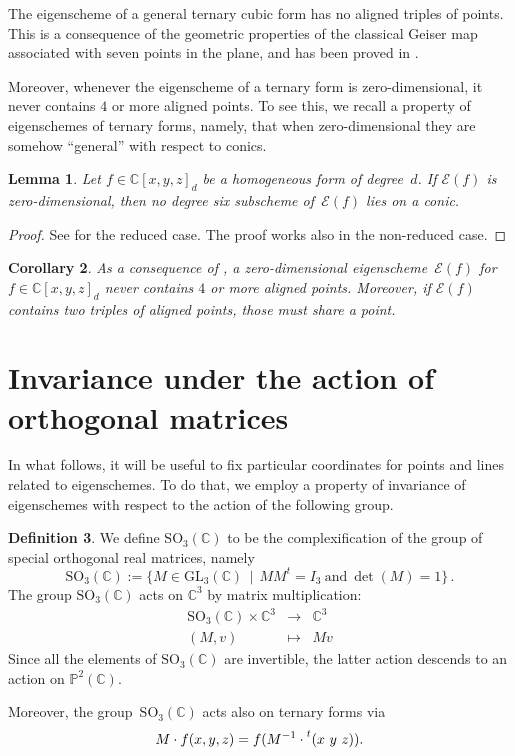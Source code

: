 \documentclass{amsart}
\theoremstyle{plain}
\newtheorem{lemma}{Lemma}[section]
\newtheorem{corollary}[lemma]{Corollary}
\theoremstyle{definition}
\newtheorem{definition}[lemma]{Definition}
\newcommand{\C}{\mathbb{C}}
\newcommand{\p}{\mathbb{P}}
\newcommand{\Eig}[1]{\mathcal{E}\!\left( {#1} \right)}
\begin{document}
The eigenscheme of a general ternary cubic form has no aligned triples of points. This is a consequence of the geometric properties of the classical Geiser map associated with seven points in the plane, and has been proved in \cite[Proposition~4.5]{BGV}.

Moreover, whenever the eigenscheme of a ternary form is zero-dimensional, it never contains $4$ or more aligned points.
To see this, we recall a property of eigenschemes of ternary forms, namely,
that when zero-dimensional they are somehow ``general'' with respect to conics.

\begin{lemma}
\label{lemma:no_six_conic}
Let $f \in \C[x,y,z]_d$ be a homogeneous form of degree~$d$.
If $\Eig{f}$ is zero-dimensional,
then no degree six subscheme of~$\Eig{f}$ lies on a conic.
\end{lemma}
\begin{proof}
See \cite[Lemma~9.1]{OS1} for the reduced case.
The proof works also in the non-reduced case.
\end{proof}

\begin{corollary}
\label{corollary:general_no_triple}
As a consequence of , a zero-dimensional eigenscheme~$\Eig{f}$ for $f \in \C[x,y,z]_d$ never contains $4$ or more aligned points.
Moreover, if $\Eig{f}$ contains two triples of aligned points, those must share a point.
\end{corollary}

\section{Invariance under the action of orthogonal matrices}
\label{invariance}

In what follows, it will be useful to fix particular coordinates for points and lines related to eigenschemes. To do that, we employ a property of invariance of eigenschemes with respect to the action of the following group.

\begin{definition}
 We define $\mathrm{SO}_3(\mathbb{C})$ to be the complexification of the group of special orthogonal real matrices, namely
 \[
  \mathrm{SO}_3(\mathbb{C}) :=
  \bigl\{
   M \in \mathrm{GL}_3(\C) \, \mid \,
   M M^t = I_3 \  \text{and} \  \det(M) = 1
  \bigr\} \,.
 \]
 The group $\mathrm{SO}_3(\mathbb{C})$ acts on $\C^3$ by matrix multiplication:
 \[
  \begin{array}{ccc}
   \mathrm{SO}_3(\mathbb{C}) \times \C^3 & \rightarrow & \C^3 \\
   (M, v) & \mapsto & Mv
  \end{array}
 \]
 Since all the elements of $\mathrm{SO}_3(\mathbb{C})$ are invertible, the latter action descends to an action on $\p^2(\C)$.

 Moreover, the group~$\mathrm{SO}_3(\mathbb{C})$ acts also on ternary forms via
 \[
  M \cdot f (x,y,z) = f(M^{-1} \cdot \prescript{t} {}( x \ y \ z )  ).
 \]
\end{definition}
\end{document}
